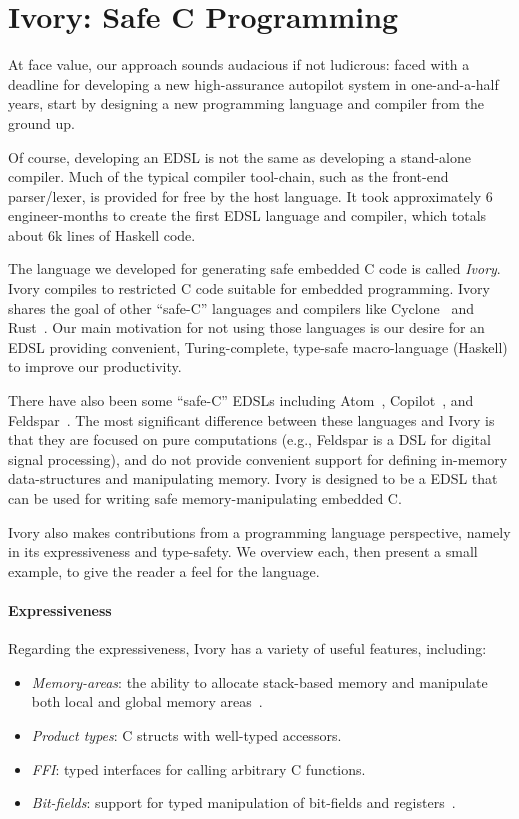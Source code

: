 \section{Ivory: Safe C Programming}
\label{sec:ivory}

At face value, our approach sounds audacious if not ludicrous: faced with a
deadline for developing a new high-assurance autopilot system in one-and-a-half
years, start by designing a new programming language and compiler from the
ground up.

Of course, developing an EDSL is not the same as developing a stand-alone
compiler.  Much of the typical compiler tool-chain, such as the front-end
parser/lexer, is provided for free by the host language.  It took approximately
6 engineer-months to create the first EDSL language and compiler, which totals
about 6k lines of Haskell code.

The language we developed for generating safe embedded C code is called
\emph{Ivory}.  Ivory compiles to restricted C code suitable for embedded
programming.  Ivory shares the goal of other ``safe-C'' languages and compilers
like Cyclone~\cite{cyclone} and Rust~\cite{rust}.  Our main motivation for not
using those languages is our desire for an EDSL providing convenient,
Turing-complete, type-safe macro-language (Haskell) to improve our productivity.

There have also been some ``safe-C'' EDSLs including Atom~\cite{atom},
Copilot~\cite{copilot}, and Feldspar~\cite{feldspar1}.  The most significant
difference between these languages and Ivory is that they are focused on pure
computations (e.g., Feldspar is a DSL for digital signal processing), and do not
provide convenient support for defining in-memory data-structures and
manipulating memory.  Ivory is designed to be a EDSL that can be used for
writing safe memory-manipulating embedded C.

Ivory also makes  contributions from a programming language
perspective, namely in its expressiveness and type-safety.  We overview each,
then present a small example, to give the reader a feel for the language.

\paragraph{Expressiveness}
Regarding the expressiveness, Ivory has a variety of useful features, including:
\begin{itemize}
  \item \emph{Memory-areas}: the ability to allocate stack-based memory and
    manipulate both local and global memory areas~\cite{memareas}.
  \item \emph{Product types}: C structs with well-typed accessors.
  \item \emph{FFI}: typed interfaces for calling arbitrary C functions.
  \item \emph{Bit-fields}: support for typed manipulation of bit-fields and
    registers~\cite{high-level}.
\end{itemize}


